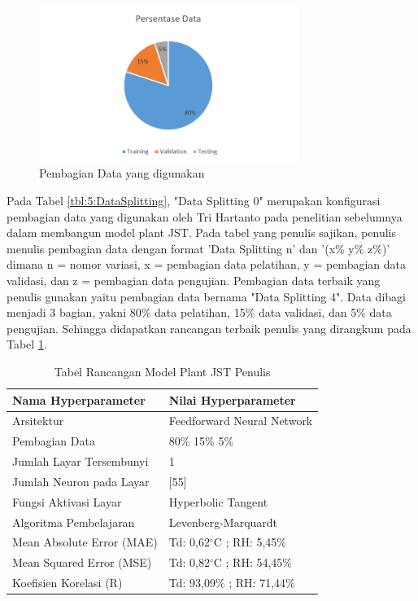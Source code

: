 \begin{figure}[!h]
	\centering
	\includegraphics[width=0.75\textwidth]{figures/DataSplittingFinal}
	\caption{Pembagian Data yang digunakan}
	\label{fig:5:DataSplittingFinal}
\end{figure}
\vspace{1em}

Pada Tabel \ref{tbl:5:DataSplitting}, "Data Splitting 0" merupakan konfigurasi pembagian data yang digunakan oleh Tri Hartanto pada penelitian sebelumnya dalam membangun model plant JST. Pada tabel yang penulis sajikan, penulis menulis pembagian data dengan format 'Data Splitting n' dan '(x\% y\% z\%)' dimana n = nomor variasi, x = pembagian data pelatihan, y = pembagian data validasi, dan z = pembagian data pengujian. Pembagian data terbaik yang penulis gunakan yaitu pembagian data bernama "Data Splitting 4". Data dibagi menjadi 3 bagian, yakni 80\% data pelatihan, 15\% data validasi, dan 5\% data pengujian. Sehingga didapatkan rancangan terbaik penulis yang dirangkum pada Tabel \ref{tbl:5:NNPlantRidhan}.\\

\begin{table}[!h]
	\caption{Tabel Rancangan Model Plant JST Penulis}
	\label{tbl:5:NNPlantRidhan}
	\centering
	\begin{tabular}{|p{5.7cm}|p{5cm}|}
		\hline
		\textbf{Nama Hyperparameter} & \textbf{Nilai Hyperparameter} \\ \hline
		Arsitektur & Feedforward Neural Network \\ \hline
		Pembagian Data & 80\% 15\% 5\% \\ \hline 
		Jumlah Layar Tersembunyi & 1 \\ \hline
		Jumlah Neuron pada Layar & [55] \\ \hline
		Fungsi Aktivasi Layar & Hyperbolic Tangent \\ \hline
		Algoritma Pembelajaran & Levenberg-Marquardt \\ \hline
		Mean Absolute Error (MAE) & Td: 0,62$^\circ$C ; RH: 5,45\% \\ \hline
		Mean Squared Error (MSE) & Td: 0,82$^\circ$C ; RH: 54,45\% \\ \hline
		Koefisien Korelasi (R) & Td: 93,09\% ; RH: 71,44\% \\ \hline
	\end{tabular}
\end{table}

